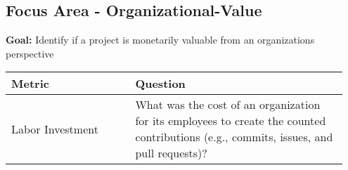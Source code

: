 
\subsection{Focus Area - Organizational-Value}
\textbf{Goal:} Identify if a project is monetarily valuable from an organizations perspective
\begin{table}[ht!]
    \centering
    \begin{tabular}{|p{0.35\linewidth} | p{0.6\linewidth}|}
        \hline
        \hfil \textbf{Metric}  & \hfil \textbf{Question} \\
        \hline
		Labor Investment & What was the cost of an organization for its employees to create the counted contributions (e.g., commits, issues, and pull requests)? \\ 
		\hline
    \end{tabular}
\end{table}

 
